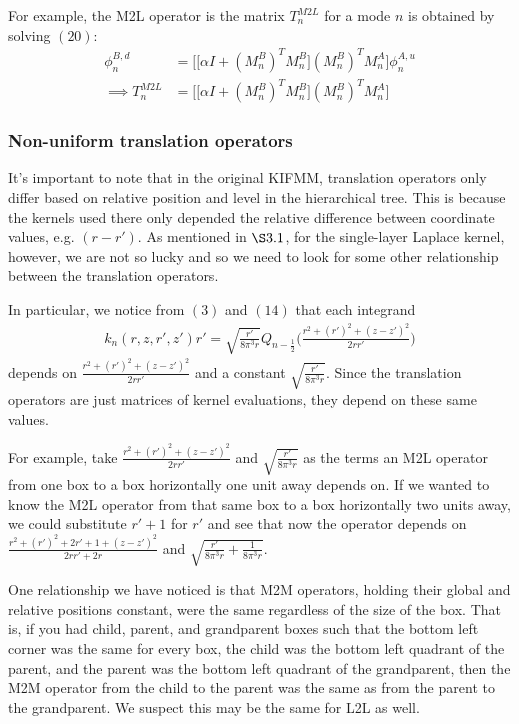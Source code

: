 \documentclass[12pt,letterpaper]{article}
\begin{document}
For example, the M2L operator is the matrix $T^{M2L}_n$ for a mode $n$ is obtained by solving $(20)$:
\begin{align}
\phi^{B,d}_n&=\bigg[\big[\alpha I +(M_n^B)^TM_n^B\big](M_n^B)^TM_n^A\bigg]\phi^{A,u}_n\\
\implies T^{M2L}_n &= \bigg[\big[\alpha I +(M_n^B)^TM_n^B\big](M_n^B)^TM_n^A\bigg]
\end{align}

\subsubsection{Non-uniform translation operators}
It's important to note that in the original KIFMM, translation operators only differ based on relative position and level in the hierarchical tree. This is because the kernels used there only depended the relative difference between coordinate values, e.g. $(r-r')$. As mentioned in $\S3.1$, for the single-layer Laplace kernel, however, we are not so lucky and so we need to look for some other relationship between the translation operators.

In particular, we notice from $(3)$ and $(14)$ that each integrand
\begin{align}
k_n(r,z,r',z')r'=\sqrt{\frac{r'}{8\pi^3r}}Q_{n-\frac{1}{2}}\bigg(\frac{r^2+(r')^2+(z-z')^2}{2rr'}\bigg)
\end{align}
depends on $\frac{r^2+(r')^2+(z-z')^2}{2rr'}$ and a constant $\sqrt{\frac{r'}{8\pi^3r}}$. Since the translation operators are just matrices of kernel evaluations, they depend on these same values.

For example, take $\frac{r^2+(r')^2+(z-z')^2}{2rr'}$ and $\sqrt{\frac{r'}{8\pi^3r}}$ as the terms an M2L operator from one box to a box horizontally one unit away depends on. If we wanted to know the M2L operator from that same box to a box horizontally two units away, we could substitute $r'+1$ for $r'$ and see that now the operator depends on $\frac{r^2+(r')^2+2r'+1+(z-z')^2}{2rr'+2r}$ and $\sqrt{\frac{r'}{8\pi^3r}+\frac{1}{8\pi^3r}}$. 

One relationship we have noticed is that M2M operators, holding their global and relative positions constant, were the same regardless of the size of the box. That is, if you had child, parent, and grandparent boxes such that the bottom left corner was the same for every box, the child was the bottom left quadrant of the parent, and the parent was the bottom left quadrant of the grandparent, then the M2M operator from the child to the parent was the same as from the parent to the grandparent. We suspect this may be the same for L2L as well.
\end{document}
